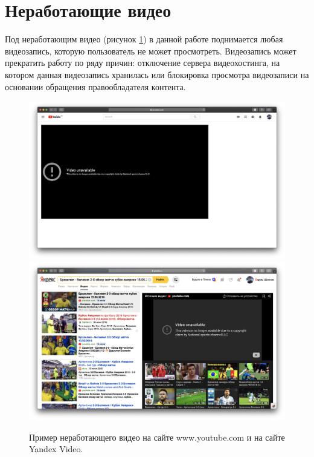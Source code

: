 \section{Неработающие видео}

Под неработающим видео (рисунок \ref{fig:bad_video}) в данной работе поднимается любая видеозапись, которую пользователь не может просмотреть. Видеозапись может прекратить работу по ряду причин: отключение сервера видеохостинга, на котором данная видеозапись хранилась или блокировка просмотра видеозаписи на основании обращения правообладателя контента.

\begin{figure}
    \centering
    \includegraphics[width=\textwidth]{../images/youtube_bad.png}
    \includegraphics[width=\textwidth]{../images/yandex_video_bad.png}
    \caption{Пример неработающего видео на сайте www.youtube.com и на сайте Yandex Video.}
    \label{fig:bad_video}
\end{figure}

